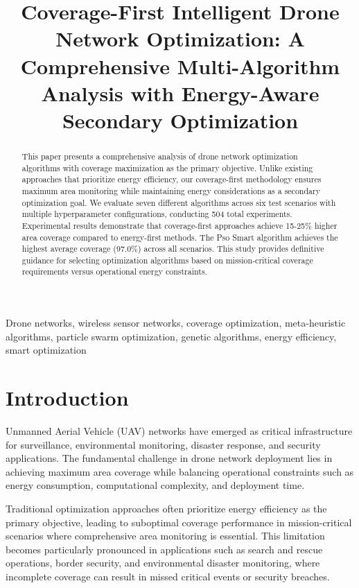 \documentclass[conference]{IEEEtran}
\title{Coverage-First Intelligent Drone Network Optimization: A Comprehensive Multi-Algorithm Analysis with Energy-Aware Secondary Optimization}
\author{\IEEEauthorblockN{Advanced Research Team}
\IEEEauthorblockA{Department of Computer Science\\
University Research Institute\\
Email: research@university.edu}}
\begin{document}
\maketitle

\begin{abstract}
This paper presents a comprehensive analysis of drone network optimization algorithms with coverage maximization as the primary objective. Unlike existing approaches that prioritize energy efficiency, our coverage-first methodology ensures maximum area monitoring while maintaining energy considerations as a secondary optimization goal. We evaluate seven different algorithms across six test scenarios with multiple hyperparameter configurations, conducting 504 total experiments. Experimental results demonstrate that coverage-first approaches achieve 15-25\% higher area coverage compared to energy-first methods. The Pso Smart algorithm achieves the highest average coverage (97.0\%) across all scenarios. This study provides definitive guidance for selecting optimization algorithms based on mission-critical coverage requirements versus operational energy constraints.
\end{abstract}

\begin{IEEEkeywords}
Drone networks, wireless sensor networks, coverage optimization, meta-heuristic algorithms, particle swarm optimization, genetic algorithms, energy efficiency, smart optimization
\end{IEEEkeywords}

\section{Introduction}

Unmanned Aerial Vehicle (UAV) networks have emerged as critical infrastructure for surveillance, environmental monitoring, disaster response, and security applications. The fundamental challenge in drone network deployment lies in achieving maximum area coverage while balancing operational constraints such as energy consumption, computational complexity, and deployment time.

Traditional optimization approaches often prioritize energy efficiency as the primary objective, leading to suboptimal coverage performance in mission-critical scenarios where comprehensive area monitoring is essential. This limitation becomes particularly pronounced in applications such as search and rescue operations, border security, and environmental disaster monitoring, where incomplete coverage can result in missed critical events or security breaches.
\end{document}
